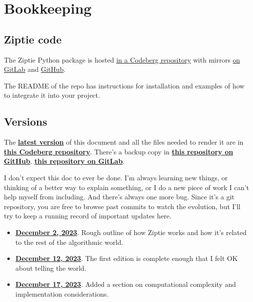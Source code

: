 \section{Bookkeeping}
\label{sec:bookkeeping}

\subsection{Ziptie code}
\label{subsec:code}

The Ziptie Python package is hosted
\href{
https://codeberg.org/brohrer/ziptie
}{in a Codeberg repository}
with mirrors
\href{
https://gitlab.com/brohrer/ziptie
}{on GitLab} and
\href{
https://github.com/brohrer/ziptie
}{GitHub}.

The README of the repo has instructions for installation and
examples of how to integrate it into your project.

\subsection{Versions}
\label{subsec:versions}

The \textbf{\href{
https://codeberg.org/brohrer/ziptie-paper/src/branch/main/ziptie.pdf}
{latest version}}
of this document and all the files needed to
render it are in \textbf{\href{
https://codeberg.org/brohrer/ziptie-paper}
{this Codeberg repository}}. There's a backup copy in \textbf{
\href{https://github.com/brohrer/ziptie-paper}
{this repository on GitHub}}.
 \textbf{
\href{https://gitlab.com/brohrer/ziptie-paper}
{this repository on GitLab}}.

I don't expect this doc to ever be done. I'm always learning new things,
or thinking of a better way to explain something, or I do a new
piece of work I can't help myself from including. And there's always
one more bug.
Since it's a git repository, you are free to browse past commits to watch
the evolution, but I'll try to keep a running record of important updates
here.

\begin{itemize}
\item{\textbf{\href{
https://codeberg.org/brohrer/ziptie-paper/src/commit/758b34e0749b75f35c98818d11d41553a8828b48/ziptie.pdf}
{December 2, 2023}}. Rough outline of how Ziptie works
and how it's related to the rest of the algorithmic world.}
\item{\textbf{\href{
https://codeberg.org/brohrer/ziptie-paper/src/tag/2023-12-12/ziptie.pdf}
{December 12, 2023}}. The first edition is complete enough that
I felt OK about telling the world.}
\item{\textbf{\href{
https://codeberg.org/brohrer/ziptie-paper/src/tag/2023-12-17/ziptie.pdf}
{December 17, 2023}}. Added a section on
computational complexity and implementation considerations.}
\end{itemize}

